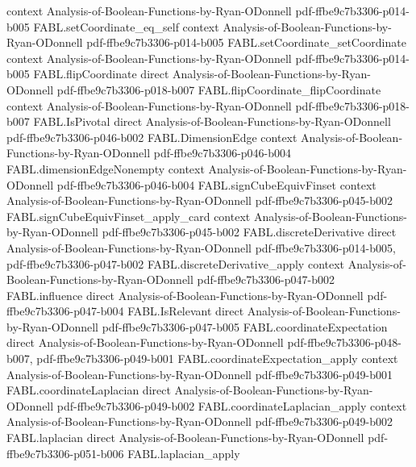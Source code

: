 \begin{theorem}
  {context}
  {Analysis-of-Boolean-Functions-by-Ryan-ODonnell}
  {pdf-ffbe9c7b3306-p014-b005}
\proofstep
  {FABL.setCoordinate_eq_self}
  {context}
  {Analysis-of-Boolean-Functions-by-Ryan-ODonnell}
  {pdf-ffbe9c7b3306-p014-b005}
\proofstep
  {FABL.setCoordinate_setCoordinate}
  {context}
  {Analysis-of-Boolean-Functions-by-Ryan-ODonnell}
  {pdf-ffbe9c7b3306-p014-b005}
\proofstep
  {FABL.flipCoordinate}
  {direct}
  {Analysis-of-Boolean-Functions-by-Ryan-ODonnell}
  {pdf-ffbe9c7b3306-p018-b007}
\proofstep
  {FABL.flipCoordinate_flipCoordinate}
  {context}
  {Analysis-of-Boolean-Functions-by-Ryan-ODonnell}
  {pdf-ffbe9c7b3306-p018-b007}
\proofstep
  {FABL.IsPivotal}
  {direct}
  {Analysis-of-Boolean-Functions-by-Ryan-ODonnell}
  {pdf-ffbe9c7b3306-p046-b002}
\proofstep
  {FABL.DimensionEdge}
  {context}
  {Analysis-of-Boolean-Functions-by-Ryan-ODonnell}
  {pdf-ffbe9c7b3306-p046-b004}
\proofstep
  {FABL.dimensionEdgeNonempty}
  {context}
  {Analysis-of-Boolean-Functions-by-Ryan-ODonnell}
  {pdf-ffbe9c7b3306-p046-b004}
\proofstep
  {FABL.signCubeEquivFinset}
  {context}
  {Analysis-of-Boolean-Functions-by-Ryan-ODonnell}
  {pdf-ffbe9c7b3306-p045-b002}
\proofstep
  {FABL.signCubeEquivFinset_apply_card}
  {context}
  {Analysis-of-Boolean-Functions-by-Ryan-ODonnell}
  {pdf-ffbe9c7b3306-p045-b002}
\proofstep
  {FABL.discreteDerivative}
  {direct}
  {Analysis-of-Boolean-Functions-by-Ryan-ODonnell}
  {pdf-ffbe9c7b3306-p014-b005,
    pdf-ffbe9c7b3306-p047-b002}
\proofstep
  {FABL.discreteDerivative_apply}
  {context}
  {Analysis-of-Boolean-Functions-by-Ryan-ODonnell}
  {pdf-ffbe9c7b3306-p047-b002}
\proofstep
  {FABL.influence}
  {direct}
  {Analysis-of-Boolean-Functions-by-Ryan-ODonnell}
  {pdf-ffbe9c7b3306-p047-b004}
\proofstep
  {FABL.IsRelevant}
  {direct}
  {Analysis-of-Boolean-Functions-by-Ryan-ODonnell}
  {pdf-ffbe9c7b3306-p047-b005}
\proofstep
  {FABL.coordinateExpectation}
  {direct}
  {Analysis-of-Boolean-Functions-by-Ryan-ODonnell}
  {pdf-ffbe9c7b3306-p048-b007,
    pdf-ffbe9c7b3306-p049-b001}
\proofstep
  {FABL.coordinateExpectation_apply}
  {context}
  {Analysis-of-Boolean-Functions-by-Ryan-ODonnell}
  {pdf-ffbe9c7b3306-p049-b001}
\proofstep
  {FABL.coordinateLaplacian}
  {direct}
  {Analysis-of-Boolean-Functions-by-Ryan-ODonnell}
  {pdf-ffbe9c7b3306-p049-b002}
\proofstep
  {FABL.coordinateLaplacian_apply}
  {context}
  {Analysis-of-Boolean-Functions-by-Ryan-ODonnell}
  {pdf-ffbe9c7b3306-p049-b002}
\proofstep
  {FABL.laplacian}
  {direct}
  {Analysis-of-Boolean-Functions-by-Ryan-ODonnell}
  {pdf-ffbe9c7b3306-p051-b006}
\proofstep
  {FABL.laplacian_apply}

\end{theorem}
